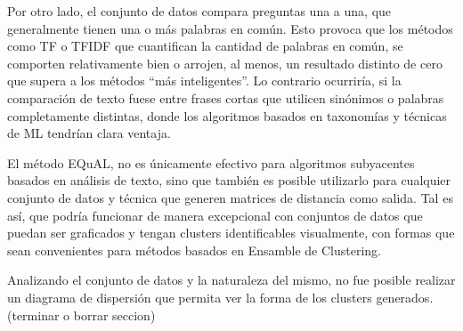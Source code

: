 \bigskip Por otro lado, el conjunto de datos compara preguntas una a una, que generalmente tienen una o más palabras en común. Esto provoca que los métodos como TF o TFIDF que cuantifican la cantidad de palabras en común, se comporten relativamente bien o arrojen, al menos, un  resultado distinto de cero que supera a los métodos “más inteligentes”. Lo contrario ocurriría, si la comparación de texto fuese entre frases cortas que utilicen sinónimos o palabras completamente distintas, donde los algoritmos basados en taxonomías y técnicas de ML tendrían clara ventaja.

\bigskip El método EQuAL, no es únicamente efectivo para algoritmos subyacentes basados en análisis de texto, sino que también es posible utilizarlo para cualquier conjunto de datos y técnica que generen matrices de distancia como salida. Tal es así, que podría funcionar de manera excepcional con conjuntos de datos que puedan ser graficados y tengan clusters identificables visualmente, con formas que sean convenientes para métodos basados en Ensamble de Clustering.


\bigskip Analizando el conjunto de datos y la naturaleza del mismo, no fue posible realizar un diagrama de dispersión que permita ver la forma de los clusters generados.
(terminar o borrar seccion)
